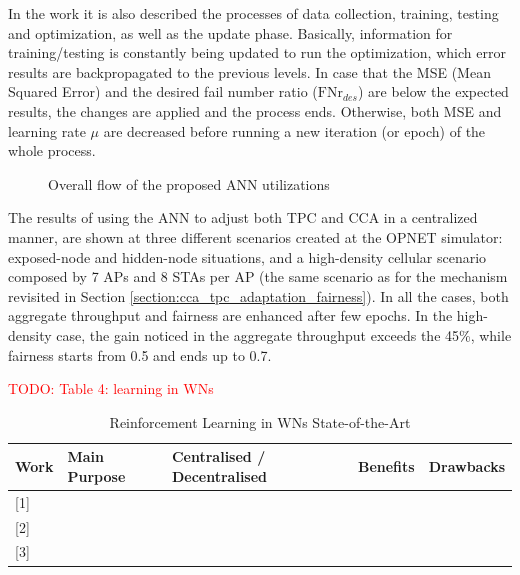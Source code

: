 \documentclass[12pt, a4paper,twoside]{tesi_upf}
\begin{document}
				In the work it is also described the processes of data collection, training, testing and optimization, as well as the update phase. Basically, information for training/testing is constantly being updated to run the optimization, which error results are backpropagated to the previous levels. In case that the MSE (Mean Squared Error) and the desired fail number ratio ($\text{FNr}_{des}$) are below the expected results, the changes are applied and the process ends. Otherwise, both MSE and learning rate $\mu$ are decreased before running a new iteration (or epoch) of the whole process.
				
				\begin{figure}[h!]
					\centering
					\caption{Overall flow of the proposed ANN utilizations}
					\label{fig:entire_procedure_ANN}
				\end{figure}
				
				The results of using the ANN to adjust both TPC and CCA in a centralized manner, are shown at three different scenarios created at the OPNET simulator: exposed-node and hidden-node situations, and a high-density cellular scenario composed by 7 APs and 8 STAs per AP (the same scenario as for the mechanism revisited in Section \ref{section:cca_tpc_adaptation_fairness}). In all the cases, both aggregate throughput and fairness are enhanced after few epochs. In the high-density case, the gain noticed in the aggregate throughput exceeds the 45\%, while fairness starts from 0.5 and ends up to 0.7.

				\textcolor{red}{TODO: Table 4: learning in WNs}
				\begin{table}[h!]
					\centering
					\begin{tabular}{|l|l|l|l|l|}
						\hline
						\textbf{Work} & \textbf{Main Purpose} & \textbf{Centralised / Decentralised} & \textbf{Benefits} & \textbf{Drawbacks} \\ \hline
						{[}1{]} &  &  &  &  \\ \hline
						{[}2{]} &  &  &  &  \\ \hline
						{[}3{]} &  &  &  &  \\ \hline
					\end{tabular}
					\caption{Reinforcement Learning in WNs State-of-the-Art}
					\label{tbl:rl_wns}
				\end{table}			
	
\end{document}
